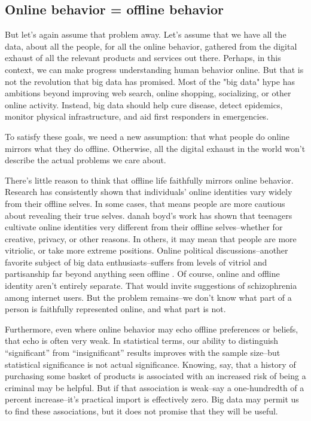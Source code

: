 \documentclass[12pt]{article}
\begin{document}
\subsection{Online behavior = offline behavior}
\label{sec:online-offline}

But let's again assume that problem away. Let's assume that we have
all the data, about all the people, for all the online behavior,
gathered from the digital exhaust of all the relevant products and
services out there. Perhaps, in this context, we can make progress
understanding human behavior online. But that is not the revolution
that big data has promised. Most of the "big data" hype has ambitions
beyond improving web search, online shopping, socializing, or other
online activity. Instead, big data should help cure disease, detect
epidemics, monitor physical infrastructure, and aid first responders
in emergencies. 

To satisfy these goals, we need a new assumption: that what
people do online mirrors what they do offline. Otherwise, all the
digital exhaust in the world won't describe the actual problems we
care about. 

There's little reason to think that offline life faithfully mirrors
online behavior. Research has consistently shown that individuals'
online identities vary widely from their offline selves. In some
cases, that means people are more cautious about revealing their true
selves. danah boyd's work \citep{boyd2011social} has shown that
teenagers cultivate online identities very different from their
offline selves--whether for creative, privacy, or other reasons. In
others, it may mean that people are more vitriolic, or take more
extreme positions. Online political discussions--another favorite
subject of big data enthusiasts--suffers from levels of vitriol and partisanship far beyond
anything seen offline \citep{conover2011}. Of course, online and
offline identity aren't entirely separate. That would invite
suggestions of schizophrenia among internet users. But the problem
remains--we don't know what part of a person is faithfully represented
online, and what part is not.

Furthermore, even where online behavior may echo offline preferences
or beliefs, that echo is often very weak. In statistical terms, our
ability to distinguish ``significant'' from ``insignificant'' results
improves with the sample size--but statistical significance is not
actual significance. Knowing, say, that a history of purchasing some
basket of products is associated with an increased risk of being a
criminal may be helpful. But if that association is weak--say a
one-hundredth of a percent increase--it's practical import is
effectively zero. Big data may permit us to find these associations,
but it does not promise that they will be useful. 
\end{document}
